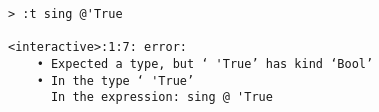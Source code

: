 \begin{repl}\begin{lstlisting}
> :t sing @'True

<interactive>:1:7: error:
    • Expected a type, but ‘ 'True’ has kind ‘Bool’
    • In the type ‘ 'True’
      In the expression: sing @ 'True\end{lstlisting}\end{repl}
